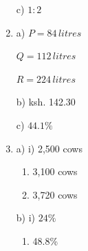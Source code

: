 \documentclass[
  a4paperpaper,
]{scrbook}
\providecommand{\tightlist}{%
  \setlength{\itemsep}{0pt}\setlength{\parskip}{0pt}}\usepackage{longtable,booktabs,array}
\begin{document}
\begin{tcolorbox}
\begin{enumerate}
  c) \(1:2\)
\item
  a) \(P=84 \, litres\)

  \(Q=112\, litres\)

  \(R=224 \, litres\)

  b) ksh. 142.30

  c) \(44.1\%\)
\item
  a) i) 2,500 cows

  \begin{enumerate}
  \def\labelenumii{\roman{enumii})}
  \setcounter{enumii}{1}
  \item
    3,100 cows
  \item
    3,720 cows
  \end{enumerate}

  b) i) \(24\%\)

  \begin{enumerate}
  \def\labelenumii{\roman{enumii})}
  \setcounter{enumii}{1}
  \tightlist
  \item
    48.8\%
  \end{enumerate}
\end{enumerate}

\end{tcolorbox}
\end{document}

